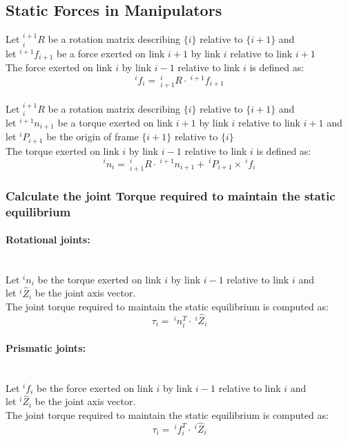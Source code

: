 \documentclass[10pt,a4paper]{article}
\begin{document}
\subsection{Static Forces in Manipulators}
Let $^{i+1}_iR$ be a rotation matrix describing $\{i\}$ relative to $\{i+1\}$ and\\
let $^{i+1}f_{i+1}$ be a force exerted on link $i+1$ by link $i$ relative to link $i+1$ \\
The force exerted on link $i$ by link $i-1$ relative to link $i$ is defined as:
$$
^if_i = ~^i_{i+1}R ⋅ ~^{i+1}f_{i+1}
$$ \\

Let $^{i+1}_iR$ be a rotation matrix describing $\{i\}$ relative to $\{i+1\}$ and\\
let $^{i+1}n_{i+1}$ be a torque exerted on link $i+1$ by link $i$ relative to link $i+1$ and \\
let $^iP_{i+1}$ be the origin of frame $\{i+1\}$ relative to $\{i\}$ \\
The torque exerted on link $i$ by link $i-1$ relative to link $i$ is defined as:
$$
^in_i = ~^i_{i+1}R ⋅ ~^{i+1}n_{i+1} + ~^iP_{i+1} \times ~^if_i
$$

\subsubsection{Calculate the joint Torque required to maintain the static equilibrium}
\paragraph{Rotational joints:} ~\\
Let $^in_i$ be the torque exerted on link $i$ by link $i-1$ relative to link $i$ and\\
let $^i\hat{Z}_i$ be the joint axis vector. \\
The joint torque required to maintain the static equilibrium is computed as:
$$
\tau_i = ~^in_i^T ⋅ ~^i\hat{Z}_i
$$

\paragraph{Prismatic joints:} ~\\
Let $^if_i$ be the force exerted on link $i$ by link $i-1$ relative to link $i$ and\\
let $^i\hat{Z}_i$ be the joint axis vector. \\
The joint torque required to maintain the static equilibrium is computed as:
$$
\tau_i = ~^if_i^T ⋅ ~^i\hat{Z}_i
$$
\end{document}
